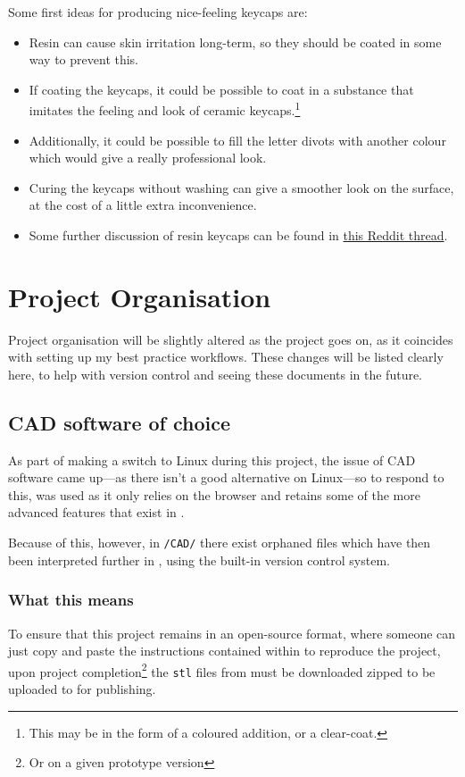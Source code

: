 \documentclass[11pt,a4paper]{article}
\numberwithin{equation}{section}
\begin{document}
Some first ideas for producing nice-feeling keycaps are:
\begin{itemize}
    \item Resin can cause skin irritation long-term, so they should be coated in some way to prevent this.
    \item If coating the keycaps, it could be possible to coat in a substance that imitates the feeling and look of ceramic keycaps.\footnote{This may be in the form of a coloured addition, or a clear-coat.}
    \item Additionally, it could be possible to fill the letter divots with another colour which would give a really professional look.
    \item Curing the keycaps without washing can give a smoother look on the surface, at the cost of a little extra inconvenience.
    \item Some further discussion of resin keycaps can be found in \href{https://www.reddit.com/r/resinprinting/comments/thtnry/resin_printed_keycaps_for_my_keyboard/}{this Reddit thread}.
\end{itemize}

\section{Project Organisation}

Project organisation will be slightly altered as the project goes on, as it coincides with setting up my best practice workflows. These changes will be listed clearly here, to help with version control and seeing these documents in the future.

\subsection{CAD software of choice}

As part of making a switch to Linux during this project, the issue of CAD software came up---as there isn't a good \SOLIDWORKS alternative on Linux---so to respond to this, \ONSHAPE was used as it only relies on the browser and retains some of the more advanced features that exist in \SOLIDWORKS.

Because of this, however, in \texttt{/CAD/} there exist orphaned \SOLIDWORKS files which have then been interpreted further in \ONSHAPE, using the \ONSHAPE built-in version control system.

\subsubsection{What this means}

To ensure that this project remains in an open-source format, where someone can just copy and paste the instructions contained within to reproduce the project, upon project completion\footnote{Or on a given prototype version} the \texttt{stl} files from \ONSHAPE must be downloaded zipped to be uploaded to \GITHUB for publishing.
\end{document}
